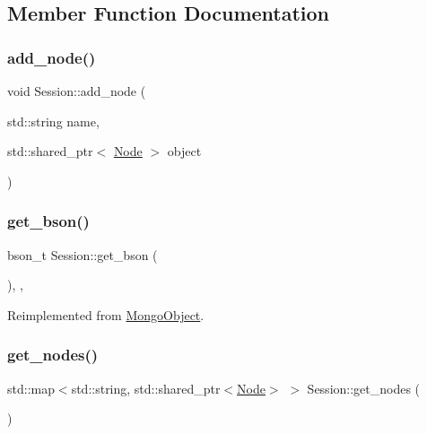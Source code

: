\subsection{Member Function Documentation}
\mbox{\label{class_session_a7b5d3b9db809cc54e515639b78b0e811}} 
\subsubsection{\texorpdfstring{add\+\_\+node()}{add\_node()}}
{\footnotesize\ttfamily void Session\+::add\+\_\+node (\begin{DoxyParamCaption}\item[{std\+::string}]{name,  }\item[{std\+::shared\+\_\+ptr$<$ \hyperlink{class_node}{Node} $>$}]{object }\end{DoxyParamCaption})\hspace{0.3cm}{\ttfamily [inline]}}

\mbox{\label{class_session_aa517fe6138a0cc32e27ddf1eb7331520}} 
\subsubsection{\texorpdfstring{get\+\_\+bson()}{get\_bson()}}
{\footnotesize\ttfamily bson\+\_\+t Session\+::get\+\_\+bson (\begin{DoxyParamCaption}{ }\end{DoxyParamCaption})\hspace{0.3cm}{\ttfamily [final]}, {\ttfamily [protected]}, {\ttfamily [virtual]}}



Reimplemented from \hyperlink{class_mongo_object_ac21cbe104a818f7e6ee7dcfbb521e9e1}{Mongo\+Object}.

\mbox{\label{class_session_af091cae3db4abcc5afe4a8abaef222f2}} 
\subsubsection{\texorpdfstring{get\+\_\+nodes()}{get\_nodes()}}
{\footnotesize\ttfamily std\+::map$<$std\+::string, std\+::shared\+\_\+ptr$<$\hyperlink{class_node}{Node}$>$ $>$ Session\+::get\+\_\+nodes (\begin{DoxyParamCaption}{ }\end{DoxyParamCaption})\hspace{0.3cm}{\ttfamily [inline]}}

